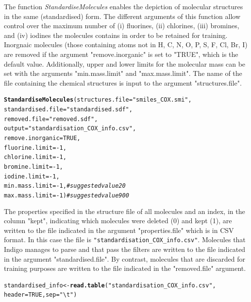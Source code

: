 \documentclass[twoside,a4wide,12pt]{article}\usepackage[]{graphicx}\usepackage[]{color}
\makeatletter
\newcommand{\hlnum}[1]{\textcolor[rgb]{0.686,0.059,0.569}{#1}}%
\newcommand{\hlstr}[1]{\textcolor[rgb]{0.192,0.494,0.8}{#1}}%
\newcommand{\hlcom}[1]{\textcolor[rgb]{0.678,0.584,0.686}{\textit{#1}}}%
\newcommand{\hlopt}[1]{\textcolor[rgb]{0,0,0}{#1}}%
\newcommand{\hlstd}[1]{\textcolor[rgb]{0.345,0.345,0.345}{#1}}%
\newcommand{\hlkwb}[1]{\textcolor[rgb]{0.69,0.353,0.396}{#1}}%
\newcommand{\hlkwc}[1]{\textcolor[rgb]{0.333,0.667,0.333}{#1}}%
\newcommand{\hlkwd}[1]{\textcolor[rgb]{0.737,0.353,0.396}{\textbf{#1}}}%
\newenvironment{kframe}{%
 \def\at@end@of@kframe{}%
 \ifinner\ifhmode%
  \def\at@end@of@kframe{\end{minipage}}%
  \begin{minipage}{\columnwidth}%
 \fi\fi%
 \def\FrameCommand##1{\hskip\@totalleftmargin \hskip-\fboxsep
 \colorbox{shadecolor}{##1}\hskip-\fboxsep
     \hskip-\linewidth \hskip-\@totalleftmargin \hskip\columnwidth}%
 \MakeFramed {\advance\hsize-\width
   \@totalleftmargin\z@ \linewidth\hsize
   \@setminipage}}%
 {\par\unskip\endMakeFramed%
 \at@end@of@kframe}
\newenvironment{knitrout}{}{} %
\makeatother
\begin{document}
The function {\it StandardiseMolecules} enables the depiction of molecular structures in the same (standardised) form.
The different arguments of this function allow control over the maximum number of (i) fluorines, (ii) chlorines,
(iii) bromines, and (iv) iodines the molecules contains in order to be retained for training.
Inorgnaic molecules (those containing atoms not in {H, C, N, O, P, S, F, Cl, Br, I}) are removed if the argument "remove.inorganic" is set to "TRUE", which is the default value.
Additionally, upper and lower limits for the molecular mass can be set with the arguments "min.mass.limit" and "max.mass.limit".
The name of the file containing the chemical structures is input to the argument "structures.file".
\begin{knitrout}
\color{fgcolor}\begin{kframe}
\begin{alltt}
\hlkwd{StandardiseMolecules}\hlstd{(}\hlkwc{structures.file}\hlstd{=}\hlstr{"smiles_COX.smi"}\hlstd{,}
\hlkwc{standardised.file}\hlstd{=}\hlstr{"standardised.sdf"}\hlstd{,}
\hlkwc{removed.file}\hlstd{=}\hlstr{"removed.sdf"}\hlstd{,}
\hlkwc{output}\hlstd{=}\hlstr{"standardisation_COX_info.csv"}\hlstd{,}
\hlkwc{remove.inorganic}\hlstd{=}\hlnum{TRUE}\hlstd{,}
\hlkwc{fluorine.limit}\hlstd{=}\hlopt{-}\hlnum{1}\hlstd{,}
\hlkwc{chlorine.limit}\hlstd{=}\hlopt{-}\hlnum{1}\hlstd{,}
\hlkwc{bromine.limit}\hlstd{=}\hlopt{-}\hlnum{1}\hlstd{,}
\hlkwc{iodine.limit}\hlstd{=}\hlopt{-}\hlnum{1}\hlstd{,}
\hlkwc{min.mass.limit}\hlstd{=}\hlopt{-}\hlnum{1}\hlstd{,} \hlcom{#suggested value 20}
\hlkwc{max.mass.limit}\hlstd{=}\hlopt{-}\hlnum{1}\hlstd{)} \hlcom{#suggested value  900}
\end{alltt}
\end{kframe}
\end{knitrout}

The properties specified in the structure file of all molecules and an index, in the column "kept", indicating which molecules were deleted (0) and kept (1),
are written to the file indicated in the argument "properties.file" which is in CSV format.
In this case the file is \verb|"standardisation_COX_info.csv"|.
Molecules that Indigo manages to parse and that pass the filters are written to the file indicated in the argument "standardised.file".
By contrast, molecules that are discarded for training purposes are written to the file indicated in the "removed.file" argument.

\begin{knitrout}
\color{fgcolor}\begin{kframe}
\begin{alltt}
\hlstd{standardised_info} \hlkwb{<-} \hlkwd{read.table}\hlstd{(}\hlstr{"standardisation_COX_info.csv"}\hlstd{,}
    \hlkwc{header} \hlstd{=} \hlnum{TRUE}\hlstd{,} \hlkwc{sep} \hlstd{=} \hlstr{"\textbackslash{}t"}\hlstd{)}
\end{alltt}
\end{kframe}
\end{knitrout}
\end{document}
